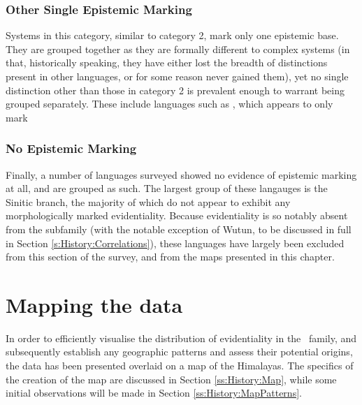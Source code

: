 \subsubsection{Other Single Epistemic Marking}
Systems in this category, similar to category 2, mark only one epistemic base. They are grouped together as they are formally different to complex systems (in that, historically speaking, they have either lost the breadth of distinctions present in other languages, or for some reason never gained them), yet no single distinction other than those in category 2 is prevalent enough to warrant being grouped separately. These include languages such as , which appears to only mark 
\subsubsection{No Epistemic Marking}
Finally, a number of languages surveyed showed no evidence of epistemic marking at all, and are grouped as such. The largest group of these langauges is the Sinitic branch, the majority of which do not appear to exhibit any morphologically marked evidentiality. Because evidentiality is so notably absent from the subfamily (with the notable exception of Wutun, to be discussed in full in Section \ref{s:History:Correlations}), these languages have largely been excluded from this section of the survey, and from the maps presented in this chapter.

\section{Mapping the data}\label{s:History:Map}
In order to efficiently visualise the distribution of evidentiality in the \lfam\ family, and subsequently establish any geographic patterns and assess their potential origins, the data has been presented overlaid on a map of the Himalayas. The specifics of the creation of the map are discussed in Section \ref{ss:History:Map}, while some initial observations will be made in Section \ref{ss:History:MapPatterns}.

